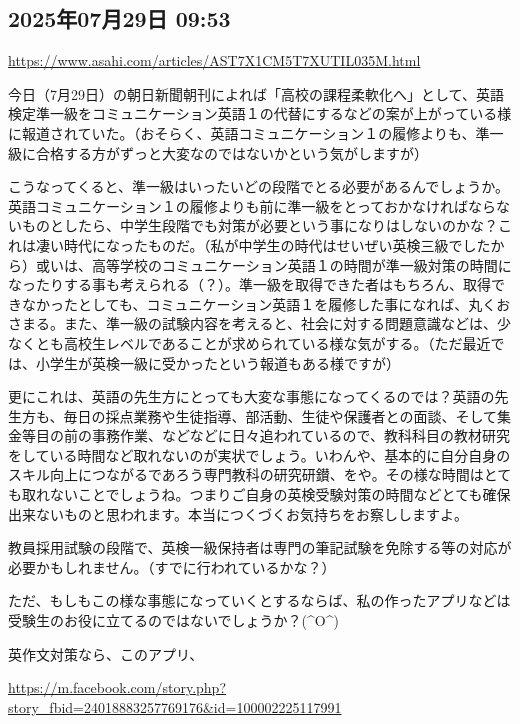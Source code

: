\documentclass[facebook_diary.tex]{subfiles}
\begin{document}
\subsection*{2025年07月29日 09:53}

\url{https://www.asahi.com/articles/AST7X1CM5T7XUTIL035M.html}




今日（7月29日）の朝日新聞朝刊によれば「高校の課程柔軟化へ」として、英語検定準一級をコミュニケーション英語１の代替にするなどの案が上がっている様に報道されていた。（おそらく、英語コミュニケーション１の履修よりも、準一級に合格する方がずっと大変なのではないかという気がしますが）


こうなってくると、準一級はいったいどの段階でとる必要があるんでしょうか。英語コミュニケーション１の履修よりも前に準一級をとっておかなければならないものとしたら、中学生段階でも対策が必要という事になりはしないのかな？これは凄い時代になったものだ。（私が中学生の時代はせいぜい英検三級でしたから）或いは、高等学校のコミュニケーション英語１の時間が準一級対策の時間になったりする事も考えられる（？）。準一級を取得できた者はもちろん、取得できなかったとしても、コミュニケーション英語１を履修した事になれば、丸くおさまる。また、準一級の試験内容を考えると、社会に対する問題意識などは、少なくとも高校生レベルであることが求められている様な気がする。（ただ最近では、小学生が英検一級に受かったという報道もある様ですが）


更にこれは、英語の先生方にとっても大変な事態になってくるのでは？英語の先生方も、毎日の採点業務や生徒指導、部活動、生徒や保護者との面談、そして集金等目の前の事務作業、などなどに日々追われているので、教科科目の教材研究をしている時間など取れないのが実状でしょう。いわんや、基本的に自分自身のスキル向上につながるであろう専門教科の研究研鑚、をや。その様な時間はとても取れないことでしょうね。つまりご自身の英検受験対策の時間などとても確保出来ないものと思われます。本当につくづくお気持ちをお察ししますよ。

教員採用試験の段階で、英検一級保持者は専門の筆記試験を免除する等の対応が必要かもしれません。（すでに行われているかな？）


ただ、もしもこの様な事態になっていくとするならば、私の作ったアプリなどは受験生のお役に立てるのではないでしょうか？(\textasciicircum{}O\textasciicircum{})


英作文対策なら、このアプリ、

\url{https://m.facebook.com/story.php?story_fbid=24018883257769176&id=100002225117991}
\end{document}
